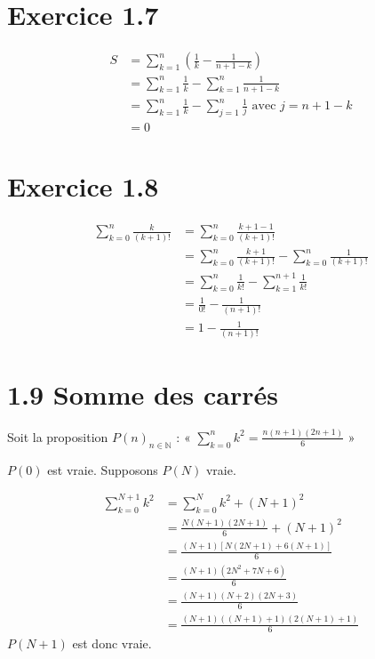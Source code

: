 \documentclass{report}
\begin{document}
\section*{Exercice 1.7}	
\begin{equation*}
	\begin{split}
		S &=\sum_{k=1}^{n}\left( \frac{1}{k} - \frac{1}{n+1-k}\right) \\
		  &=\sum_{k=1}^{n} \frac{1}{k} - \sum_{k=1}^{n}\frac{1}{n+1-k} \\
		  &=\sum_{k=1}^{n} \frac{1}{k} - \sum_{j=1}^{n}\frac{1}{j} \text{ avec $j=n+1-k$}\\
		  &=0
	\end{split}
\end{equation*}

\section*{Exercice 1.8}	
\begin{equation*}
	\begin{split}
		\sum_{k=0}^{n}\frac{k}{(k+1)!} &= \sum_{k=0}^{n}\frac{k + 1 - 1}{(k+1)!} \\
		                               &= \sum_{k=0}^{n}\frac{k + 1}{(k+1)!} - \sum_{k=0}^{n}\frac{1}{(k+1)!} \\
		                               &= \sum_{k=0}^{n}\frac{1}{k!} - \sum_{k=1}^{n+1}\frac{1}{k!} \\
		                               &= \frac{1}{0!}-\frac{1}{(n+1)!} \\
		                               &= 1 -\frac{1}{(n+1)!}
	\end{split}
\end{equation*}


\section*{1.9 Somme des carrés}

Soit la proposition $P(n)_{n \in \mathbb{N}}$ : « $ \sum_{k=0}^{n}k^2 = \frac{n(n+1)(2n+1)}{6}$ »

$P(0)$ est vraie. Supposons $P(N)$ vraie.

\begin{equation*}
	\begin{split}
		\sum_{k=0}^{N+1}k^2 &= \sum_{k=0}^{N}k^2 + (N+1)^2 \\
		                    &= \frac{N(N+1)(2N+1)}{6} + (N+1)^2 \\
		                    &= \frac{(N+1)\left[N(2N+1) + 6(N+1)\right]}{6} \\
		                    &= \frac{(N+1)(2N^2 + 7N +6)}{6} \\
		                    &= \frac{(N+1)(N+2)(2N + 3)}{6} \\
		                    &= \frac{(N+1)((N+1)+1)(2(N+1) + 1)}{6}
	\end{split}
\end{equation*}
$P(N+1)$ est donc vraie.
\end{document}
